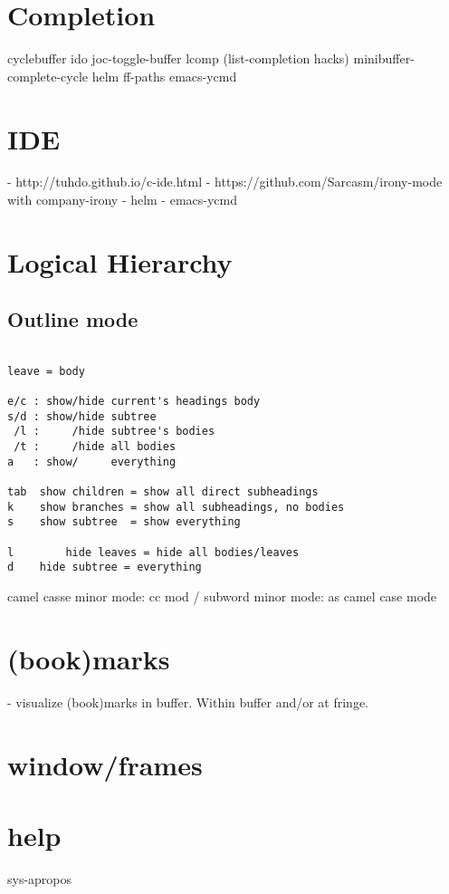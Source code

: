 \documentclass[a4paper]{report}
\begin{document}
\section{Completion}
cyclebuffer
ido
joc-toggle-buffer
lcomp (list-completion hacks)
minibuffer-complete-cycle
helm
ff-paths
emacs-ycmd

\section{IDE}
- http://tuhdo.github.io/c-ide.html
- https://github.com/Sarcasm/irony-mode with company-irony
- helm
- emacs-ycmd

\section{Logical Hierarchy}

\subsection{Outline mode}
\begin{verbatim}

leave = body

e/c : show/hide current's headings body 
s/d : show/hide subtree 
 /l :     /hide subtree's bodies 
 /t :     /hide all bodies
a   : show/     everything

tab  show children = show all direct subheadings
k    show branches = show all subheadings, no bodies
s    show subtree  = show everything

l		 hide leaves = hide all bodies/leaves
d    hide subtree = everything
\end{verbatim}
camel casse minor mode:
cc mod / subword minor mode: as camel case mode

\section{(book)marks}

- visualize (book)marks in buffer. Within buffer and/or at fringe.

\section{window/frames}

\section{help}
sys-apropos
\end{document}

